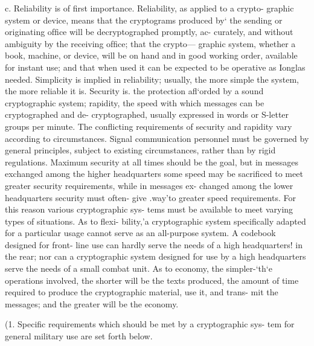 c. Reliability is of ﬁrst importance. Reliability, as applied to a crypto-
graphic system or device, means that the cryptograms produced by‘ the
sending or originating ofﬁce will be decryptographed promptly, ac-
curately, and without ambiguity by the receiving ofﬁce; that the crypto—
graphic system, whether a book, machine, or device, will be on hand and
in good working order, available for instant use; and that when used it
can be expected to be operative as Ionglas needed. Simplicity is implied
in reliability; usually, the more simple the system, the more reliable it is.
Security is. the protection aﬂ‘orded by a sound cryptographic system;
rapidity, the speed with which messages can be cryptographed and de-
cryptographed, usually expressed in words or S-letter groups per minute.
The conﬂicting requirements of security and rapidity vary according to
circumstances. Signal communication personnel must be governed by
general principles, subject to existing circumstances, rather than by rigid
regulations. Maximum security at all times should be the goal, but in
messages exchanged among the higher headquarters some speed may be
sacriﬁced to meet greater security requirements, while in messages ex-
changed among the lower headquarters security must often- give .way'to
greater speed requirements. For this reason various cryptographic sys-
tems must be available to meet varying types of situations. As to ﬂexi-
bility,'a cryptographic system speciﬁcally adapted for a particular usage
cannot serve as an all-purpose system. A codebook designed for front-
line use can hardly serve the needs of a high headquarters! in the rear;
nor can a cryptographic system designed for use by a high headquarters
serve the needs of a small combat unit. As to economy, the simpler-‘th‘e
operations involved, the shorter will be the texts produced, the amount
of time required to produce the cryptographic material, use it, and trans-
mit the messages; and the greater will be the economy.

(1. Speciﬁc requirements which should be met by a cryptographic sys-
tem for general military use are set forth below.

